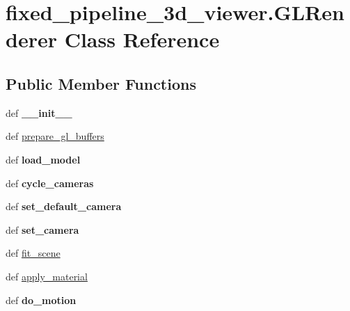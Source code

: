 \hypertarget{classfixed__pipeline__3d__viewer_1_1_g_l_renderer}{\section{fixed\+\_\+pipeline\+\_\+3d\+\_\+viewer.\+G\+L\+Renderer Class Reference}
\label{classfixed__pipeline__3d__viewer_1_1_g_l_renderer}
}
\subsection*{Public Member Functions}
\begin{DoxyCompactItemize}
\item 
\hypertarget{classfixed__pipeline__3d__viewer_1_1_g_l_renderer_ae528ea2cee3e201318fb94882e722841}{def {\bfseries \+\_\+\+\_\+init\+\_\+\+\_\+}}\label{classfixed__pipeline__3d__viewer_1_1_g_l_renderer_ae528ea2cee3e201318fb94882e722841}

\item 
def \hyperlink{classfixed__pipeline__3d__viewer_1_1_g_l_renderer_af41374b498d63f64599775f2d1398432}{prepare\+\_\+gl\+\_\+buffers}
\item 
\hypertarget{classfixed__pipeline__3d__viewer_1_1_g_l_renderer_a11b88b08b00b1aae9d7f74cf90477467}{def {\bfseries load\+\_\+model}}\label{classfixed__pipeline__3d__viewer_1_1_g_l_renderer_a11b88b08b00b1aae9d7f74cf90477467}

\item 
\hypertarget{classfixed__pipeline__3d__viewer_1_1_g_l_renderer_a64a486de2da2de187ce7fff6292b94ad}{def {\bfseries cycle\+\_\+cameras}}\label{classfixed__pipeline__3d__viewer_1_1_g_l_renderer_a64a486de2da2de187ce7fff6292b94ad}

\item 
\hypertarget{classfixed__pipeline__3d__viewer_1_1_g_l_renderer_a20561de8bc0612d5b08ddae1c36aa9de}{def {\bfseries set\+\_\+default\+\_\+camera}}\label{classfixed__pipeline__3d__viewer_1_1_g_l_renderer_a20561de8bc0612d5b08ddae1c36aa9de}

\item 
\hypertarget{classfixed__pipeline__3d__viewer_1_1_g_l_renderer_ac62f9ce05b19f5fc94725b54b20e8284}{def {\bfseries set\+\_\+camera}}\label{classfixed__pipeline__3d__viewer_1_1_g_l_renderer_ac62f9ce05b19f5fc94725b54b20e8284}

\item 
def \hyperlink{classfixed__pipeline__3d__viewer_1_1_g_l_renderer_aba40eba4879d5de87b49fffc330ee098}{fit\+\_\+scene}
\item 
def \hyperlink{classfixed__pipeline__3d__viewer_1_1_g_l_renderer_a38912d159613b07ad22829feb226c8ee}{apply\+\_\+material}
\item 
\hypertarget{classfixed__pipeline__3d__viewer_1_1_g_l_renderer_a6173ba48657dde1919dcf394272ec5c5}{def {\bfseries do\+\_\+motion}}\label{classfixed__pipeline__3d__viewer_1_1_g_l_renderer_a6173ba48657dde1919dcf394272ec5c5}


\end{DoxyCompactItemize}

